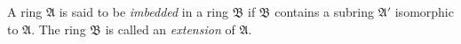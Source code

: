 A ring $\mathfrak{A}$ is said to be \emph{imbedded} in a ring $\mathfrak{B}$ if $\mathfrak{B}$ contains a subring $\mathfrak{A}'$ isomorphic to $\mathfrak{A}$. The ring $\mathfrak{B}$ is called an \emph{extension} of $\mathfrak{A}$.
